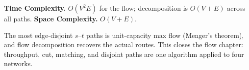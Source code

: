 \begin{complexitybox}
\textbf{Time Complexity.} $O(V^2E)$ for the flow; decomposition is $O(V+E)$
across all paths. \textbf{Space Complexity.} $O(V+E)$.
\end{complexitybox}

\begin{takeawaybox}
The most edge-disjoint $s$--$t$ paths is unit-capacity max flow (Menger's
theorem), and flow decomposition recovers the actual routes. This closes the
flow chapter: throughput, cut, matching, and disjoint paths are one
algorithm applied to four networks.
\end{takeawaybox}
